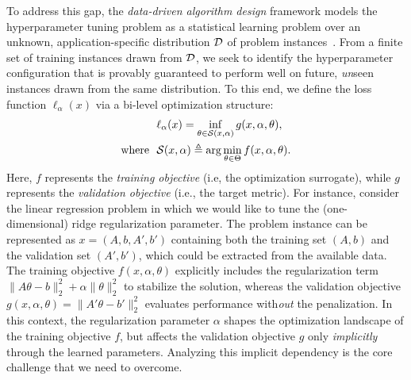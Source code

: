 \documentclass{article}
\theoremstyle{plain}
\theoremstyle{definition}
\theoremstyle{remark}
\begin{document}
To address this gap, the \textit{data-driven algorithm design} framework models the hyperparameter tuning problem as a statistical learning problem over an unknown, application-specific distribution $\mathcal{D}$ of problem instances~\citep{balcan2020data, gupta2020data}. From a finite set of training instances drawn from $\mathcal{D}$, we seek to identify the hyperparameter configuration that is provably guaranteed to perform well on future, \emph{un}seen instances drawn from the same distribution. To this end, we define the loss function $\ell_\alpha(x)$ via a bi-level optimization structure: 
\begin{equation}
    \label{eq:hyper-parameters-tuning}
    \begin{aligned}
        &\ell_\alpha(x) = \inf_{\theta \in \mathcal{S}(x, \alpha)} g(x, \alpha, \theta),\\
        \textup{where \,\,} & \mathcal{S}(x, \alpha) \triangleq \arg \min_{\theta \in \Theta} f(x, \alpha, \theta).
    \end{aligned}
\end{equation}
Here, $f$ represents the \textit{training objective} (i.e, the optimization surrogate), while $g$ represents the \textit{validation objective} (i.e., the target metric). For instance, consider the linear regression problem in which we would like to tune the (one-dimensional) ridge regularization parameter. The problem instance can be represented as $x = (A, b, A', b')$ containing both the training set $(A, b)$ and the validation set $(A', b')$, which could be extracted from the available data. The training objective $f(x, \alpha, \theta)$ explicitly includes the regularization term $\|A\theta - b\|_2^2 + \alpha\|\theta\|_2^2$ to stabilize the solution, whereas the validation objective $g(x, \alpha, \theta) = \|A'\theta - b'\|_2^2$ evaluates performance with\emph{out} the penalization. In this context, the regularization parameter $\alpha$ shapes the optimization landscape of the training objective $f$, but affects the validation objective $g$ only \textit{implicitly} through the learned parameters. Analyzing this implicit dependency is the core challenge that we need to overcome. 
\end{document}
